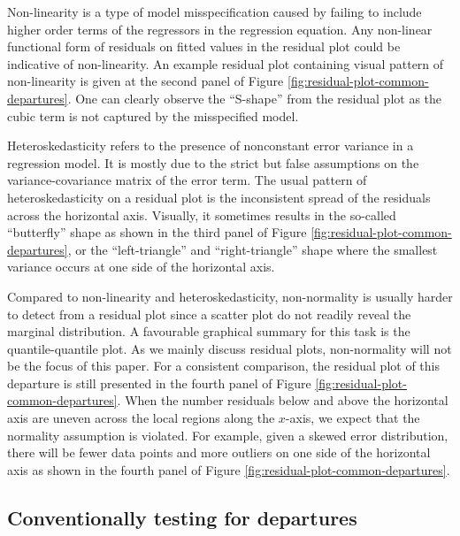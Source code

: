 \documentclass[]{interact}
\theoremstyle{plain}%
\theoremstyle{definition}
\theoremstyle{remark}
\begin{document}
Non-linearity is a type of model misspecification caused by failing to
include higher order terms of the regressors in the regression equation.
Any non-linear functional form of residuals on fitted values in the
residual plot could be indicative of non-linearity. An example residual
plot containing visual pattern of non-linearity is given at the second
panel of Figure \ref{fig:residual-plot-common-departures}. One can
clearly observe the ``S-shape'' from the residual plot as the cubic term
is not captured by the misspecified model.

Heteroskedasticity refers to the presence of nonconstant error variance
in a regression model. It is mostly due to the strict but false
assumptions on the variance-covariance matrix of the error term. The
usual pattern of heteroskedasticity on a residual plot is the
inconsistent spread of the residuals across the horizontal axis.
Visually, it sometimes results in the so-called ``butterfly'' shape as
shown in the third panel of Figure
\ref{fig:residual-plot-common-departures}, or the ``left-triangle'' and
``right-triangle'' shape where the smallest variance occurs at one side
of the horizontal axis.

Compared to non-linearity and heteroskedasticity, non-normality is
usually harder to detect from a residual plot since a scatter plot do
not readily reveal the marginal distribution. A favourable graphical
summary for this task is the quantile-quantile plot. As we mainly
discuss residual plots, non-normality will not be the focus of this
paper. For a consistent comparison, the residual plot of this departure
is still presented in the fourth panel of Figure
\ref{fig:residual-plot-common-departures}. When the number residuals
below and above the horizontal axis are uneven across the local regions
along the \(x\)-axis, we expect that the normality assumption is
violated. For example, given a skewed error distribution, there will be
fewer data points and more outliers on one side of the horizontal axis
as shown in the fourth panel of Figure
\ref{fig:residual-plot-common-departures}.

\hypertarget{conventionally-testing-for-departures}{%
\subsection{Conventionally testing for
departures}\label{conventionally-testing-for-departures}}
\end{document}
